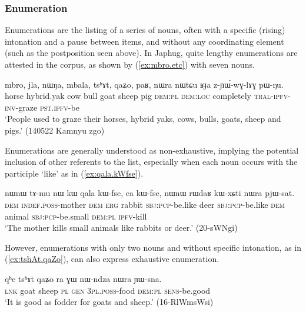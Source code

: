 \subsubsection{Enumeration} \label{sec:noun.enumeration}
Enumerations are the listing of a series of nouns, often with a specific (rising) intonation and a pause between items, and without any coordinating element (such as the postposition  seen above). In Japhug, quite lengthy enumerations are attested in the corpus, as shown by (\ref{ex:mbro.etc}) with seven nouns.
\largerpage
\begin{exe}
\ex \label{ex:mbro.etc}
 \gll mbro, jla, nɯŋa, mbala, tsʰɤt, qaʑo, paʁ, nɯra nɯtɕu ʁɟa z-ɲɯ́-wɣ-lɤɣ pɯ-ŋu. \\
 horse hybrid.yak cow bull goat sheep pig \textsc{dem}:\textsc{pl} \textsc{dem}:\textsc{loc} completely \textsc{tral}-\textsc{ipfv}-\textsc{inv}-graze \textsc{pst}.\textsc{ipfv}-be \\
\glt `People used to graze their horses, hybrid yaks, cows, bulls, goats, sheep and pigs.' (140522 Kamnyu zgo)
\end{exe}

Enumerations are generally understood as non-exhaustive, implying the potential inclusion of other referents to the list, especially when each noun occurs with the participle  `like' as in (\ref{ex:qala.kWfse}).

\begin{exe}
\ex \label{ex:qala.kWfse}
 \gll  nɯnɯ tɤ-mu nɯ kɯ qala kɯ-fse, ca kɯ-fse, nɯnɯ rɯdaʁ kɯ-xɕti nɯra pjɯ-sat. \\
\textsc{dem} \textsc{indef}.\textsc{poss}-mother \textsc{dem} \textsc{erg} rabbit \textsc{sbj}:\textsc{pcp}-be.like deer \textsc{sbj}:\textsc{pcp}-be.like  \textsc{dem} animal \textsc{sbj}:\textsc{pcp}-be.small \textsc{dem}:\textsc{pl} \textsc{ipfv}-kill \\
\glt `The mother kills small animals like rabbits or deer.' (20-sWNgi)
\end{exe}

However, enumerations with only two  nouns and without specific intonation, as in (\ref{ex:tshAt.qaZo}), can also express exhaustive enumeration.  

\begin{exe}
\ex \label{ex:tshAt.qaZo}
 \gll  qʰe tsʰɤt qaʑo ra ɣɯ nɯ-ndza nɯra ɲɯ-sna.  \\
 \textsc{lnk} goat sheep \textsc{pl} \textsc{gen} \textsc{3pl}.\textsc{poss}-food \textsc{dem}:\textsc{pl} \textsc{sens}-be.good \\
\glt `It is good as fodder for goats and sheep.' (16-RlWmsWsi)
\end{exe}

